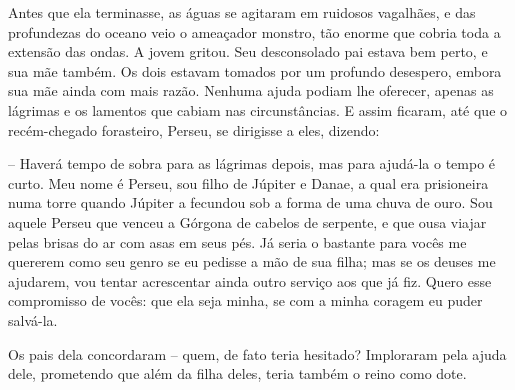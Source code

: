 Antes que ela terminasse, as águas se agitaram em ruidosos vagalhães,
e das profundezas do oceano veio o ameaçador monstro, tão enorme que
cobria toda a extensão das ondas. A jovem gritou. Seu desconsolado
pai estava bem perto, e sua mãe também. Os dois estavam tomados por
um profundo desespero, embora sua mãe ainda com mais razão. Nenhuma
ajuda podiam lhe oferecer, apenas as lágrimas e os lamentos que
cabiam nas circunstâncias. E assim ficaram, até que o recém-chegado
forasteiro, Perseu, se dirigisse a eles, dizendo:

-- Haverá tempo de sobra para as lágrimas depois, mas para ajudá-la o
tempo é curto. Meu nome é Perseu, sou filho de Júpiter e Danae, a
qual era prisioneira numa torre quando Júpiter a fecundou sob a forma
de uma chuva de ouro. Sou aquele Perseu que venceu a Górgona de
cabelos de serpente, e que ousa viajar pelas brisas do ar com asas em
seus pés. Já seria o bastante para vocês me quererem como seu genro
se eu pedisse a mão de sua filha; mas se os deuses me ajudarem, vou
tentar acrescentar ainda outro serviço aos que já fiz. Quero esse
compromisso de vocês: que ela seja minha, se com a minha coragem eu
puder salvá-la.

Os pais dela concordaram -- quem, de fato teria hesitado? Imploraram
pela ajuda dele, prometendo que além da filha deles, teria também o
reino como dote. 

